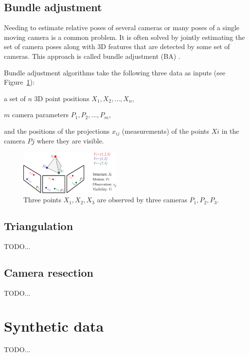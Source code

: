 \subsection{Bundle adjustment}

Needing to estimate relative poses of several cameras or many poses of a single moving camera is a common problem. It is often solved by jointly estimating the set of camera poses along with 3D features that are detected by some set of cameras. This approach is called bundle adjustment (BA) \cite{BA}.

Bundle adjustment algorithms take the following three data as inputs (see Figure~\ref{fig:BA}):
\begin{itemize*}
 \item a set of $n$ 3D point positions $X_1, X_2, \dots, X_n$,
 \item $m$ camera parameters $P_1, P_2, \dots, P_m$,
 \item and the positions of the projections $x_{ij}$ (measurements) of the points $Xi$ in the camera $Pj$ where they are visible.
\end{itemize*}

\begin{figure}[!htbp]
 \centering
 \includegraphics[width=0.45\textwidth]{images/BA.png}
 \caption{Three points $X_1, X_2, X_3$ are observed by three cameras $P_1, P_2, P_3$.}
 \label{fig:BA}
\end{figure}


\subsection{Triangulation}
TODO...

\subsection{Camera resection}
TODO...





\section{Synthetic data}

TODO...


